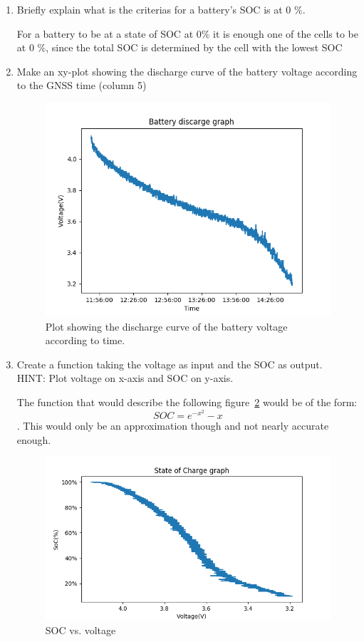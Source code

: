 \documentclass[paper=letter, fontsize=10pt]{article}
\begin{document}
\begin{enumerate}
\item Briefly explain what is the criterias for a battery's SOC is at 0 \%.

For a battery to be at a state of SOC at 0\% it is enough one of the cells to be at 0 \%, since the total SOC is determined by the cell with the lowest SOC \cite{master_thesis}

\item Make an xy-plot showing the discharge curve of the battery voltage according to the GNSS time (column 5)


\begin{figure}[H]
\centering
\includegraphics[scale=0.7]{Figures/batterydischarge}
\caption{Plot showing the discharge curve of the battery voltage according to time.}
\label{fig_battery}
\end{figure}

\item Create a function taking the voltage as input and the SOC as output.\\
HINT: Plot voltage on x-axis and SOC on y-axis.

The function that would describe the following figure~\ref{fig_SOC} would be of the form:
$$ SOC = {e}^{-x^2}-x $$. 
This would only be an approximation though and not nearly accurate enough.

\begin{figure}[H]
\centering
\includegraphics[scale=0.7]{Figures/StateOfCharge}
\caption{SOC vs. voltage}
\label{fig_SOC}
\end{figure}


\end{enumerate}
\end{document}
